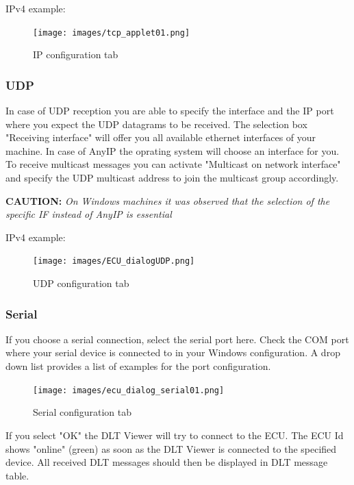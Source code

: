 \documentclass[a4paper,11pt]{article}
\newcommand{\caution}[1]{\begin{ibox} \textbf{CAUTION:} \emph{#1} \end{ibox}}
\begin{document}
IPv4 example:

\begin{figure}[h]
 \centering
 \texttt{[image: images/tcp\_applet01.png]}
 \caption{IP configuration tab}
 \label{fig:ipconfigurationtab}
\end{figure}


\subsubsection{UDP}

In case of UDP reception you are able to specify the interface and the IP port where you expect the 
UDP datagrams to be received. The selection box "Receiving interface" will offer you all available 
ethernet interfaces of your machine. In case of AnyIP the oprating system will choose an interface for you.
To receive multicast messages you can activate "Multicast on network interface" and specify the UDP multicast address
to join the multicast group accordingly.

\caution{On Windows machines it was observed that the selection of the specific IF instead of AnyIP is essential}

IPv4 example:

\begin{figure}[h]
 \centering
 \texttt{[image: images/ECU\_dialogUDP.png]}
 \caption{UDP configuration tab}
 \label{fig:udpconfigurationtab}
\end{figure}



\subsubsection{Serial}


If you choose a serial connection, select the serial port here. Check the COM port
where your serial device is connected to in your Windows configuration. A drop down
list provides a list of examples for the port configuration.

\begin{figure}[H]
 \centering
  \texttt{[image: images/ecu\_dialog\_serial01.png]}
 \caption{Serial configuration tab}
 \label{fig:serialconfigurationtab}
\end{figure}

If you select "OK" the DLT Viewer will try to connect to the ECU.
The ECU Id shows "online" (green) as soon as the DLT Viewer is connected to the
specified device.
All received DLT messages should then be displayed in DLT message table.
\end{document}
